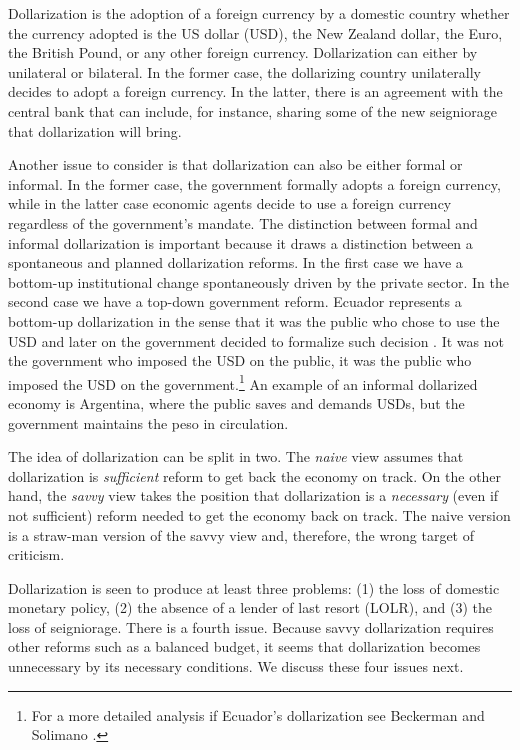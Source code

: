 \documentclass[12pt]{article}
\begin{document}
Dollarization is the adoption of a foreign currency by a domestic country whether the currency adopted is the US dollar (USD), the New Zealand dollar, the Euro, the British Pound, or any other foreign currency. Dollarization can either by unilateral or bilateral. In the former case, the dollarizing country unilaterally decides to adopt a foreign currency. In the latter, there is an agreement with the central bank that can include, for instance, sharing some of the new seigniorage that dollarization will bring.

Another issue to consider is that dollarization can also be either formal or informal. In the former case, the government formally adopts a foreign currency, while in the latter case economic agents decide to use a foreign currency regardless of the government's mandate. The distinction between formal and informal dollarization is important because it draws a distinction between a spontaneous and planned dollarization reforms. In the first case we have a bottom-up institutional change spontaneously driven by the private sector. In the second case we have a top-down government reform. Ecuador represents a bottom-up dollarization in the sense that it was the public who chose to use the USD and later on the government decided to formalize such decision \parencite{White2014a}. It was not the government who imposed the USD on the public, it was the public who imposed the USD on the government.\footnote{For a more detailed analysis if Ecuador's dollarization see Beckerman and Solimano \parencite*{Beckerman2002}.} An example of an informal dollarized economy is Argentina, where the public saves and demands USDs, but the government maintains the peso in circulation.

The idea of dollarization can be split in two. The \textit{naive} view assumes that dollarization is \textit{sufficient} reform to get back the economy on track. On the other hand, the \textit{savvy} view takes the position that dollarization is a \textit{necessary} (even if not sufficient) reform needed to get the economy back on track. The naive version is a straw-man version of the savvy view and, therefore, the wrong target of criticism. 

Dollarization is seen to produce at least three problems: (1) the loss of domestic monetary policy, (2) the absence of a lender of last resort (LOLR), and (3) the loss of seigniorage. There is a fourth issue. Because savvy dollarization requires other reforms such as a balanced budget, it seems that dollarization becomes unnecessary by its necessary conditions. We discuss these four issues next.
\end{document}
